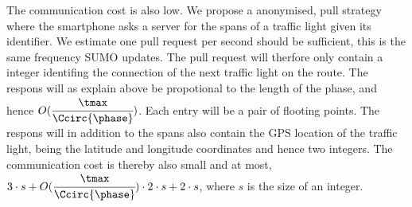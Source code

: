 The communication cost is also low.
We propose a anonymised, pull strategy where the smartphone asks a server for the spans of a traffic light given its identifier. We estimate one pull request per second should be sufficient, this is the same frequency SUMO updates.
The pull request will therfore only contain a integer identifing the connection of the next traffic light on the route.
The respons will as explain above be propotional to the length of the phase, and hence $O(\cfrac{\tmax}{\Ccirc{\phase}})$.
Each entry will be a pair of flooting points.
The respons will in addition to the spans also contain the GPS location of the traffic light, being the latitude and longitude coordinates and hence two integers.
The communication cost is thereby also small and at most, $3\cdot s + O(\cfrac{\tmax}{\Ccirc{\phase}})\cdot 2\cdot s + 2\cdot s$, where $s$ is the size of an integer.






